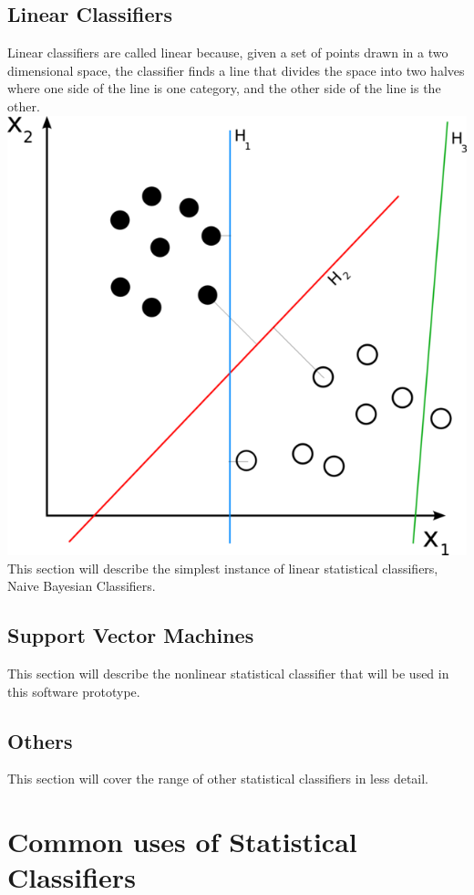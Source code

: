\documentclass[12pt]{article}
\begin{document}
\subsection{Linear Classifiers}
Linear classifiers are called linear because, given a set of points drawn in a two dimensional space, the
classifier finds a line that divides the space into two halves where one side of the line is one category, and
the other side of the line is the other.\\
\includegraphics[scale=.4,natwidth=628,natheight=600]{svm_separating_hyperplanes.png}\\
This section will describe the simplest instance of linear statistical classifiers, Naive Bayesian
Classifiers. \cite{kononenko1991semi}
\subsection{Support Vector Machines}
This section will describe the nonlinear statistical classifier that will be used in this software
prototype. \cite{hearst1998support}
\subsection{Others}
This section will cover the range of other statistical classifiers in less detail.
\section{Common uses of Statistical Classifiers}
\end{document}
